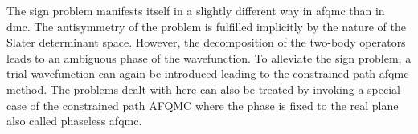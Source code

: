 The sign problem manifests itself in a slightly different way in \gls{afqmc} than in \gls{dmc}.
The antisymmetry of the problem is fulfilled implicitly by the nature of the Slater determinant space.
However, the decomposition of the two-body operators leads to an ambiguous phase of the wavefunction.
To alleviate the sign problem, a trial wavefunction can again be introduced leading to the constrained path \gls{afqmc} method.\cite{10.1103/PhysRevB.55.7464,10.1103/PhysRevLett.74.3652}
The problems dealt with here can also be treated by invoking a special case of the constrained path AFQMC where the phase is fixed to the real plane also called phaseless \gls{afqmc}.\cite{10.1103/PhysRevLett.90.136401}


